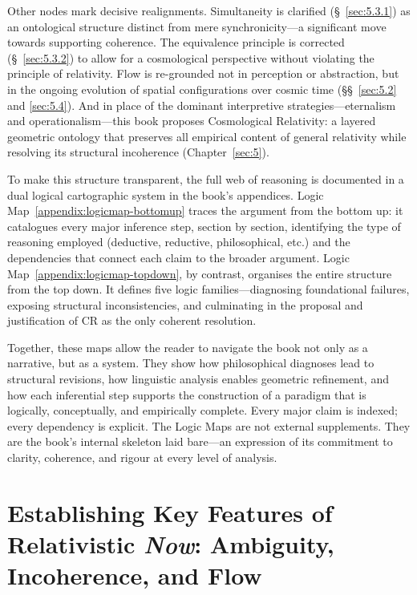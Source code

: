 \documentclass[12pt]{book}
\begin{document}
Other nodes mark decisive realignments. Simultaneity is clarified (\S~\ref{sec:5.3.1}) as an ontological structure distinct from mere synchronicity---a significant move towards supporting coherence. The equivalence principle is corrected (\S~\ref{sec:5.3.2}) to allow for a cosmological perspective without violating the principle of relativity. Flow is re-grounded not in perception or abstraction, but in the ongoing evolution of spatial configurations over cosmic time (\S\S~\ref{sec:5.2} and \ref{sec:5.4}). And in place of the dominant interpretive strategies---eternalism and operationalism---this book proposes Cosmological Relativity: a layered geometric ontology that preserves all empirical content of general relativity while resolving its structural incoherence (Chapter~\ref{sec:5}).

To make this structure transparent, the full web of reasoning is documented in a dual logical cartographic system in the book's appendices. Logic Map~\ref{appendix:logicmap-bottomup} traces the argument from the bottom up: it catalogues every major inference step, section by section, identifying the type of reasoning employed (deductive, reductive, philosophical, etc.) and the dependencies that connect each claim to the broader argument. Logic Map~\ref{appendix:logicmap-topdown}, by contrast, organises the entire structure from the top down. It defines five logic families---diagnosing foundational failures, exposing structural inconsistencies, and culminating in the proposal and justification of CR as the only coherent resolution.

Together, these maps allow the reader to navigate the book not only as a narrative, but as a system. They show how philosophical diagnoses lead to structural revisions, how linguistic analysis enables geometric refinement, and how each inferential step supports the construction of a paradigm that is logically, conceptually, and empirically complete. Every major claim is indexed; every dependency is explicit. The Logic Maps are not external supplements. They are the book's internal skeleton laid bare---an expression of its commitment to clarity, coherence, and rigour at every level of analysis.

\chapter[The Key Features of Relativistic Now]{Establishing Key Features of Relativistic \textit{Now}: Ambiguity, Incoherence, and Flow}\label{sec:2}
\end{document}
